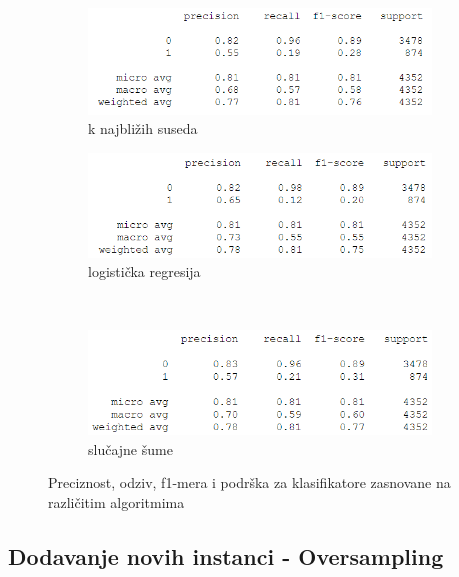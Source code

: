 \documentclass[12pt,oneside]{memoir}
\begin{document}
\begin{figure}[!ht]
    \centering
    \begin{subfigure}[b]{0.45\textwidth}
        \centering
        \includegraphics[width=\textwidth]{knn1}
        \caption{k najbližih suseda}
        \label{fig:kn1}
    \end{subfigure}
    \begin{subfigure}[b]{0.45\textwidth}
        \centering
        \includegraphics[width=\textwidth]{logreg1}
        \caption{logistička regresija}
        \label{fig:logreg1}
    \end{subfigure}
    \\
    \begin{subfigure}[b]{0.45\textwidth}
        \centering
        \includegraphics[width=\textwidth]{randfor1}
        \caption{slučajne šume}
        \label{fig:randfor1}
    \end{subfigure}
    \caption{Preciznost, odziv, f1-mera i podrška za klasifikatore zasnovane na različitim algoritmima}
    \label{fig:dodatno1}
\end{figure}


\subsection{Dodavanje novih instanci - Oversampling} 
\end{document}
